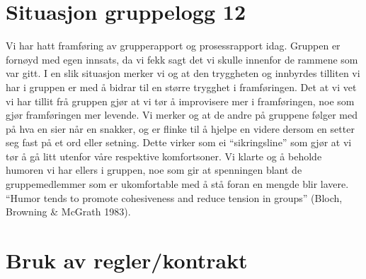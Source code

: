 \section{Situasjon gruppelogg 12}
Vi har hatt framføring av grupperapport og prosessrapport idag. Gruppen er fornøyd med egen innsats, da 
vi fekk sagt det vi skulle innenfor de rammene som var gitt. I en slik situasjon merker vi og at den 
tryggheten og innbyrdes tilliten vi har i gruppen er med å bidrar til en større trygghet i framføringen. 
Det at vi vet vi har tillit frå gruppen gjør at vi tør å improvisere mer i framføringen, noe som gjør 
framføringen mer levende. Vi merker og at de andre på gruppene følger med på hva en sier når en snakker, 
og er flinke til å hjelpe en videre dersom en setter seg fast på et ord eller setning. Dette virker som 
ei ``sikringsline'' som gjør at vi tør å gå litt utenfor våre respektive komfortsoner. Vi klarte og å beholde 
humoren vi har ellers i gruppen, noe som gir at spenningen blant de gruppemedlemmer som er ukomfortable 
med å stå foran en mengde blir lavere. ``Humor tends to promote cohesiveness and reduce tension in groups'' 
(Bloch, Browning \& McGrath 1983).\\


\section{Bruk av regler/kontrakt}

